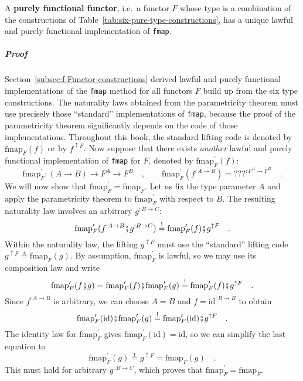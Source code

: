 A \textbf{purely functional functor},
i.e.~a functor $F$ whose type is a combination of the constructions
of Table~\ref{tab:six-pure-type-constructions}, has a unique lawful
and purely functional implementation of \lstinline!fmap!. 

\subparagraph{Proof}

Section~\ref{subsec:f-Functor-constructions} derived lawful and
purely functional implementations of the \lstinline!fmap! method
for all functors $F$ build up from the six type constructions. The
naturality laws obtained from the parametricity theorem must use precisely
those \textsf{``}standard\textsf{''} implementations of \lstinline!fmap!, because
the proof of the parametricity theorem significantly depends on the
code of those implementations. Throughout this book, the standard
lifting code is denoted by $\text{fmap}_{F}(f)$ or by $f^{\uparrow F}$.
Now suppose that there exists \emph{another} lawful and purely functional
implementation of \lstinline!fmap! for $F$, denoted by $\text{fmap}_{F}^{\prime}(f)$:
\[
\text{fmap}_{F}^{\prime}:\left(A\rightarrow B\right)\rightarrow F^{A}\rightarrow F^{B}\quad,\quad\quad\text{fmap}_{F}^{\prime}(f^{:A\rightarrow B})=\text{???}^{:F^{A}\rightarrow F^{B}}\quad.
\]
We will now show that $\text{fmap}_{F}^{\prime}=\text{fmap}_{F}$.
Let us fix the type parameter $A$ and apply the parametricity theorem
to $\text{fmap}_{F}^{\prime}$ with respect to $B$. The resulting
naturality law involves an arbitrary $g^{:B\rightarrow C}$:
\[
\text{fmap}_{F}^{\prime}(f^{:A\rightarrow B}\bef g^{:B\rightarrow C})\overset{!}{=}\text{fmap}_{F}^{\prime}(f)\bef g^{\uparrow F}\quad.
\]
Within the naturality law, the lifting $g^{\uparrow F}$ must use
the \textsf{``}standard\textsf{''} lifting code $g^{\uparrow F}\triangleq\text{fmap}_{F}(g)$.
By assumption, $\text{fmap}_{F}^{\prime}$ is lawful, so we may use
its composition law and write
\[
\text{fmap}_{F}^{\prime}(f\bef g)=\text{fmap}_{F}^{\prime}(f)\bef\text{fmap}_{F}^{\prime}(g)\overset{!}{=}\text{fmap}_{F}^{\prime}(f)\bef g^{\uparrow F}\quad.
\]
Since $f^{:A\rightarrow B}$ is arbitrary, we can choose $A=B$ and
$f=\text{id}^{:B\rightarrow B}$ to obtain
\[
\text{fmap}_{F}^{\prime}(\text{id})\bef\text{fmap}_{F}^{\prime}(g)\overset{!}{=}\text{fmap}_{F}^{\prime}(\text{id})\bef g^{\uparrow F}\quad.
\]
The identity law for $\text{fmap}_{F}^{\prime}$ gives $\text{fmap}_{F}^{\prime}(\text{id})=\text{id}$,
so we can simplify the last equation to
\[
\text{fmap}_{F}^{\prime}(g)\overset{!}{=}g^{\uparrow F}=\text{fmap}_{F}(g)\quad.
\]
This must hold for arbitrary $g^{:B\rightarrow C}$, which proves
that $\text{fmap}_{F}^{\prime}=\text{fmap}_{F}$.

